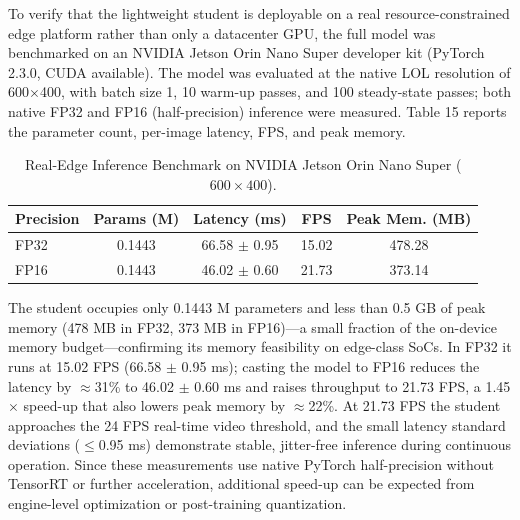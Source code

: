\documentclass[sensors,article,submit,moreauthors]{Definitions/mdpi}
\begin{document}
To verify that the lightweight student is deployable on a real resource-constrained edge platform rather than only a datacenter GPU, the full model was benchmarked on an NVIDIA Jetson Orin Nano Super developer kit (PyTorch 2.3.0, CUDA available). The model was evaluated at the native LOL resolution of 600$\times$400, with batch size 1, 10 warm-up passes, and 100 steady-state passes; both native FP32 and FP16 (half-precision) inference were measured. Table 15 reports the parameter count, per-image latency, FPS, and peak memory.

\begin{table}[H]
\caption{Real-Edge Inference Benchmark on NVIDIA Jetson Orin Nano Super ($600\times400$).\label{tab15}}
\begin{tabularx}{\textwidth}{LCCCC}
\toprule
\textbf{Precision}	& \textbf{Params (M)}	& \textbf{Latency (ms)}	& \textbf{FPS}	& \textbf{Peak Mem. (MB)}\\
\midrule
FP32	& 0.1443	& 66.58 $\pm$ 0.95	& 15.02	& 478.28\\
FP16	& 0.1443	& 46.02 $\pm$ 0.60	& 21.73	& 373.14\\
\bottomrule
\end{tabularx}
\end{table}

The student occupies only 0.1443 M parameters and less than 0.5 GB of peak memory (478 MB in FP32, 373 MB in FP16)---a small fraction of the on-device memory budget---confirming its memory feasibility on edge-class SoCs. In FP32 it runs at 15.02 FPS (66.58 $\pm$ 0.95 ms); casting the model to FP16 reduces the latency by $\approx$31\% to 46.02 $\pm$ 0.60 ms and raises throughput to 21.73 FPS, a 1.45$\times$ speed-up that also lowers peak memory by $\approx$22\%. At 21.73 FPS the student approaches the 24 FPS real-time video threshold, and the small latency standard deviations ($\leq$0.95 ms) demonstrate stable, jitter-free inference during continuous operation. Since these measurements use native PyTorch half-precision without TensorRT or further acceleration, additional speed-up can be expected from engine-level optimization or post-training quantization.
\end{document}
